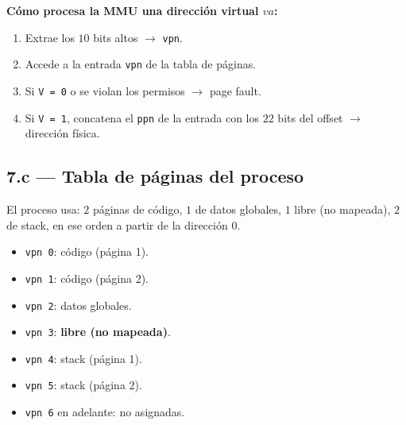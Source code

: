 \documentclass[11pt,a4paper]{article}
\begin{document}
\begin{center}
\end{center}

\textbf{Cómo procesa la MMU una dirección virtual $va$:}

\begin{enumerate}[leftmargin=*,nosep]
    \item Extrae los $10$ bits altos $\to$ \texttt{vpn}.
    \item Accede a la entrada \texttt{vpn} de la tabla de páginas.
    \item Si \texttt{V = 0} o se violan los permisos $\to$ page fault.
    \item Si \texttt{V = 1}, concatena el \texttt{ppn} de la entrada
        con los $22$ bits del offset $\to$ dirección física.
\end{enumerate}

\subsection*{7.c --- Tabla de páginas del proceso}

El proceso usa: $2$ páginas de código, $1$ de datos globales,
$1$ libre (no mapeada), $2$ de stack, en ese orden a partir de la
dirección $0$.

\begin{itemize}[leftmargin=*,nosep]
    \item \texttt{vpn 0}: código (página 1).
    \item \texttt{vpn 1}: código (página 2).
    \item \texttt{vpn 2}: datos globales.
    \item \texttt{vpn 3}: \textbf{libre (no mapeada)}.
    \item \texttt{vpn 4}: stack (página 1).
    \item \texttt{vpn 5}: stack (página 2).
    \item \texttt{vpn 6} en adelante: no asignadas.
\end{itemize}
\end{document}
